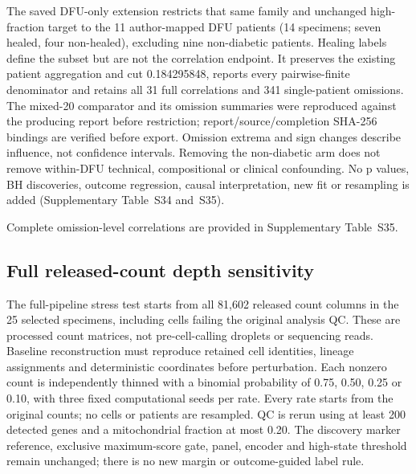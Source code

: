 \documentclass[10pt,a4paper]{article}
\begin{document}
The saved DFU-only extension restricts that same family and unchanged high-fraction target to the 11 author-mapped DFU patients (14 specimens; seven healed, four non-healed), excluding nine non-diabetic patients. Healing labels define the subset but are not the correlation endpoint. It preserves the existing patient aggregation and cut 0.184295848, reports every pairwise-finite denominator and retains all 31 full correlations and 341 single-patient omissions. The mixed-20 comparator and its omission summaries were reproduced against the producing report before restriction; report/source/completion SHA-256 bindings are verified before export. Omission extrema and sign changes describe influence, not confidence intervals. Removing the non-diabetic arm does not remove within-DFU technical, compositional or clinical confounding. No p values, BH discoveries, outcome regression, causal interpretation, new fit or resampling is added (Supplementary Table~S34 and~S35).

Complete omission-level correlations are provided in Supplementary Table~S35.

\subsection{Full released-count depth sensitivity}
The full-pipeline stress test starts from all 81,602 released count columns in the 25 selected specimens, including cells failing the original analysis QC. These are processed count matrices, not pre-cell-calling droplets or sequencing reads. Baseline reconstruction must reproduce retained cell identities, lineage assignments and deterministic coordinates before perturbation. Each nonzero count is independently thinned with a binomial probability of 0.75, 0.50, 0.25 or 0.10, with three fixed computational seeds per rate. Every rate starts from the original counts; no cells or patients are resampled. QC is rerun using at least 200 detected genes and a mitochondrial fraction at most 0.20. The discovery marker reference, exclusive maximum-score gate, panel, encoder and high-state threshold remain unchanged; there is no new margin or outcome-guided label rule.
\end{document}
